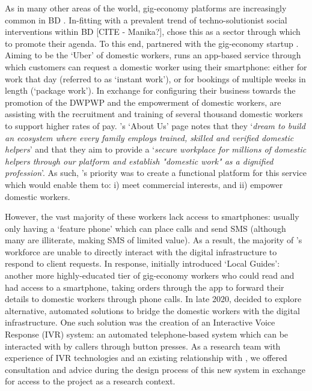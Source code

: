 As in many other areas of the world, gig-economy platforms are increasingly common in BD \cite{Ahmed2020}. In-fitting with a prevalent trend of techno-solutionist social interventions within BD [CITE - Manika?], \NGO{} chose this as a sector through which to promote their agenda. To this end, \NGO{} partnered with the gig-economy startup \PC{}. Aiming to be the `Uber' of domestic workers, \PC{} runs an app-based service through which customers can request a domestic worker using their smartphone: either for work that day (referred to as `instant work'), or for bookings of multiple weeks in length (`package work'). In exchange for configuring their business towards the promotion of the DWPWP and the empowerment of domestic workers, \NGO{} are assisting \PC{} with the recruitment and training of several thousand domestic workers to support higher rates of pay. \PC{}'s `About Us' page notes that they `\textit{dream to build an ecosystem where every family employs trained, skilled and verified domestic helpers}' and that they aim to provide a `\textit{secure workplace for millions of domestic helpers through our platform and establish "domestic work" as a dignified profession}'. As such, \PC{}'s priority was to create a functional platform for this service which would enable them to: i) meet commercial interests, and ii) empower domestic workers.

However, the vast majority of these workers lack access to smartphones: usually only having a `feature phone' which can place calls and send SMS (although many are illiterate, making SMS of limited value). As a result, the majority of \PC{}'s workforce are unable to directly interact with the digital infrastructure to respond to client requests. In response, \PC{} initially introduced `Local Guides': another more highly-educated tier of gig-economy workers who could read and had access to a smartphone, taking orders through the app to forward their details to domestic workers through phone calls. In late 2020, \PC{} decided to explore alternative, automated solutions to bridge the domestic workers with the digital infrastructure. One such solution was the creation of an Interactive Voice Response (IVR) system: an automated telephone-based system which can be interacted with by callers through button presses. As a research team with experience of IVR technologies and an existing relationship with \NGO{}, we offered consultation and advice during the design process of this new system in exchange for access to the project as a research context.